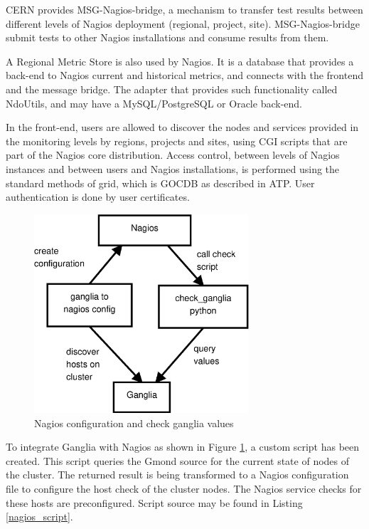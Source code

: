 CERN provides MSG-Nagios-bridge, a mechanism to transfer test results between different levels of Nagios deployment (regional, project, site). MSG-Nagios-bridge submit tests to other Nagios installations and consume results from them. 

A Regional Metric Store is also used by Nagios. It is a database that provides a back-end to Nagios current and historical metrics, and connects with the frontend and the message bridge. The adapter that provides such functionality called NdoUtils, and may have a MySQL/PostgreSQL or Oracle back-end.

In the front-end, users are allowed to discover the nodes and services provided in the monitoring levels by regions, projects and sites, using \ac{CGI} scripts that are part of the Nagios core distribution. Access control, between levels of Nagios instances and between users and Nagios installations, is performed using the standard methods of grid, which is \ac{GOCDB} as described in \ac{ATP}. User authentication is done by user certificates.

\begin{figure}[htb]
\centering
 \includegraphics[width=80mm]{images/nagios_check_ganglia.eps}
\caption{Nagios configuration and check ganglia values}
\label{figure:nagios_ganglia}
\end{figure}

To integrate Ganglia with Nagios as shown in Figure \ref{figure:nagios_ganglia}, a custom script has been created. This script queries the Gmond source for the current state of nodes of the cluster. The returned result is being transformed to a Nagios configuration file to configure the host check of the cluster nodes. The Nagios service checks for these hosts are preconfigured. Script source may be found in Listing \ref{nagios_script}.

